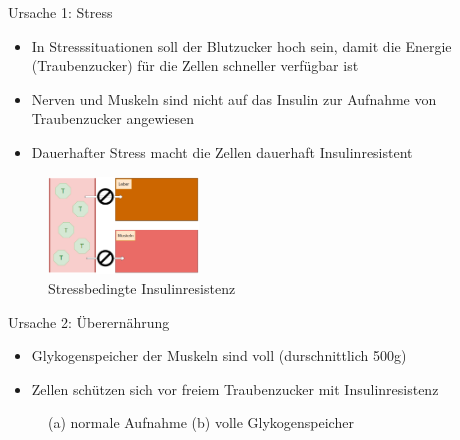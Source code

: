 \documentclass[xcolor=dvipsnames]{beamer}
\begin{document}
\begin{frame}[allowframebreaks]
        \framebreak

        \begin{block}{Ursache 1: Stress}
            \begin{itemize}
                \item In Stresssituationen soll der Blutzucker hoch sein, damit die Energie (Traubenzucker) für die Zellen schneller verfügbar ist
                \item Nerven und Muskeln sind nicht auf das Insulin zur Aufnahme von Traubenzucker angewiesen
                \item Dauerhafter Stress macht die Zellen dauerhaft Insulinresistent
            \end{itemize}
        \end{block}

        \begin{figure}
            \centering
            \includegraphics[width=4cm]{../images/ursache_1.png}
            \caption{Stressbedingte Insulinresistenz}
        \end{figure}

        \framebreak

        \begin{block}{Ursache 2: Überernährung}
            \begin{itemize}
                \item Glykogenspeicher der Muskeln sind voll (durschnittlich 500g)
                \item Zellen schützen sich vor freiem Traubenzucker mit Insulinresistenz
            \end{itemize}
        \end{block}

        \begin{figure}
            \centering
            \caption{(a) normale Aufnahme (b) volle Glykogenspeicher
            }
        \end{figure}


\end{frame}
\end{document}
